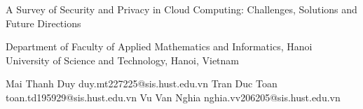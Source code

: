 A Survey of Security and Privacy in Cloud Computing: Challenges, Solutions and Future Directions




Department of Faculty of Applied Mathematics and Informatics, Hanoi University of Science and Technology, Hanoi, Vietnam




Mai Thanh Duy
duy.mt227225@sis.hust.edu.vn
Tran Duc Toan
toan.td195929@sis.hust.edu.vn
Vu Van Nghia
nghia.vv206205@sis.hust.edu.vn


